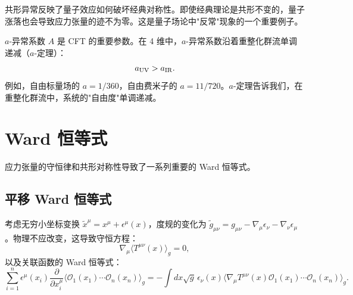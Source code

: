 \begin{remark}[共形异常的物理意义]
共形异常反映了量子效应如何破坏经典对称性。即使经典理论是共形不变的，量子涨落也会导致应力张量的迹不为零。这是量子场论中"反常"现象的一个重要例子。
\end{remark}

\begin{note}[$a$-异常系数与 $a$-定理]
$a$-异常系数 $A$ 是 CFT 的重要参数。在 4 维中，$a$-异常系数沿着重整化群流单调递减（$a$-定理）\cite{Komargodski2011}：
\begin{equation}
    a_{\rm UV} > a_{\rm IR}.
\end{equation}
例如，自由标量场的 $a = 1/360$，自由费米子的 $a = 11/720$。$a$-定理告诉我们，在重整化群流中，系统的"自由度"单调递减。
\end{note}

\section{Ward 恒等式}

应力张量的守恒律和共形对称性导致了一系列重要的 Ward 恒等式。

\subsection{平移 Ward 恒等式}

\begin{theorem}
考虑无穷小坐标变换 $\tilde{x}^\mu = x^\mu + \epsilon^\mu(x)$，度规的变化为 $\tilde{g}_{\mu\nu} = g_{\mu\nu} - \nabla_\mu \epsilon_\nu - \nabla_\nu \epsilon_\mu$。物理不应改变，这导致守恒方程：
\begin{equation}
    \nabla_\mu \langle T^{\mu\nu}(x) \rangle_g = 0,
\end{equation}
以及关联函数的 Ward 恒等式：
\begin{equation}
    \sum_{i=1}^n \epsilon^\mu(x_i) \frac{\partial}{\partial x_i^\mu} \langle \mathcal{O}_1(x_1) \cdots \mathcal{O}_n(x_n) \rangle_g = -\int dx \sqrt{g} \, \epsilon_\nu(x) \langle \nabla_\mu T^{\mu\nu}(x) \mathcal{O}_1(x_1) \cdots \mathcal{O}_n(x_n) \rangle_g.
\end{equation}
\end{theorem}

